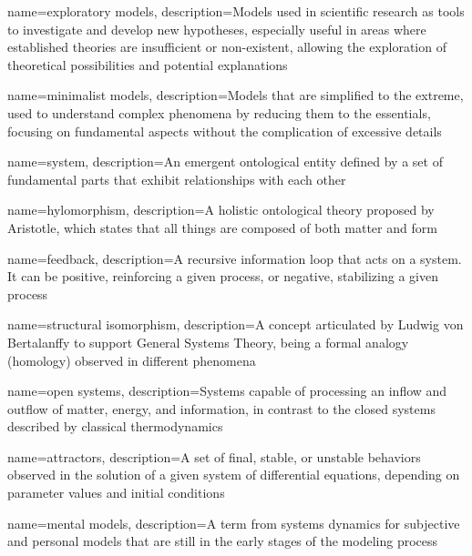 {
    name=exploratory models,
    description={Models used in scientific research as tools to investigate and develop new hypotheses, especially useful in areas where established theories are insufficient or non-existent, allowing the exploration of theoretical possibilities and potential explanations}
}

{
    name=minimalist models,
    description={Models that are simplified to the extreme, used to understand complex phenomena by reducing them to the essentials, focusing on fundamental aspects without the complication of excessive details}
}

{
    name=system,
    description={An emergent ontological entity defined by a set of fundamental parts that exhibit relationships with each other}
}

{
    name=hylomorphism,
    description={A holistic ontological theory proposed by Aristotle, which states that all things are composed of both matter and form}
}

{
    name=feedback,
    description={A recursive information loop that acts on a system. It can be positive, reinforcing a given process, or negative, stabilizing a given process}
}

{
    name=structural isomorphism,
    description={A concept articulated by Ludwig von Bertalanffy to support General Systems Theory, being a formal analogy (homology) observed in different phenomena}
}

{
    name=open systems,
    description={Systems capable of processing an inflow and outflow of matter, energy, and information, in contrast to the closed systems described by classical thermodynamics}
}

{
    name=attractors,
    description={A set of final, stable, or unstable behaviors observed in the solution of a given system of differential equations, depending on parameter values and initial conditions}
}

{
    name=mental models,
    description={A term from systems dynamics for subjective and personal models that are still in the early stages of the modeling process}
}

